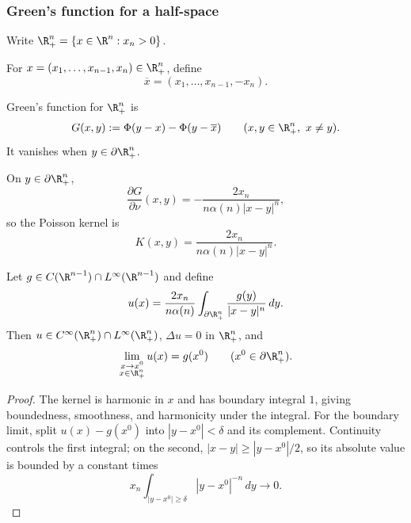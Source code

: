 \subsubsection{Green's function for a half-space}
\label{sec:laplace-greens-function-half-space}

Write $\R^n_+=\{x\in\R^n:x_n>0\}$.

\begin{definition}
\label{def:reflection-half-space}
\leanok
For $x=(x_1,\ldots,x_{n-1},x_n)\in\R^n_+$, define
$$\overline x=(x_1,\ldots,x_{n-1},-x_n).$$
\end{definition}

\begin{definition}
\label{def:greens-function-half-space}
\leanok
Green's function for $\R^n_+$ is
$$G(x,y):=\Phi(y-x)-\Phi(y-\overline x)
\qquad(x,y\in\R^n_+,\ x\ne y).$$
It vanishes when $y\in\partial\R^n_+$.
\end{definition}

On $y\in\partial\R^n_+$,
$$\frac{\partial G}{\partial\nu}(x,y)
=-\frac{2x_n}{n\alpha(n)|x-y|^n},$$
so the Poisson kernel is
$$K(x,y)=\frac{2x_n}{n\alpha(n)|x-y|^n}.$$

\begin{theorem}
\label{thm:poissons-formula-half-space}
Let $g\in C(\R^{n-1})\cap L^\infty(\R^{n-1})$ and define
$$u(x)=\frac{2x_n}{n\alpha(n)}
\int_{\partial\R^n_+}\frac{g(y)}{|x-y|^n}\,dy.$$
Then $u\in C^\infty(\R^n_+)\cap L^\infty(\R^n_+)$,
$\Delta u=0$ in $\R^n_+$, and
$$\lim_{\substack{x\to x^0\\x\in\R^n_+}}u(x)=g(x^0)
\qquad(x^0\in\partial\R^n_+).$$
\end{theorem}
\begin{proof}
\sketch The kernel is harmonic in $x$ and has boundary integral $1$, giving
boundedness, smoothness, and harmonicity under the integral. For the boundary
limit, split $u(x)-g(x^0)$ into $|y-x^0|<\delta$ and its complement.
Continuity controls the first integral; on the second,
$|x-y|\ge|y-x^0|/2$, so its absolute value is bounded by a constant times
$$x_n\int_{|y-x^0|\ge\delta}|y-x^0|^{-n}\,dy\to0.$$
\end{proof}

